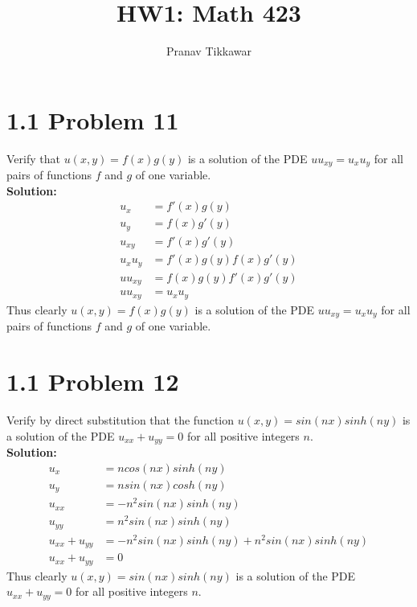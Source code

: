 \documentclass{article}
\author{Pranav Tikkawar}
\title{HW1: Math 423}
\begin{document}
\maketitle

\section*{1.1 Problem 11}
Verify that $u(x,y) = f(x)g(y)$ is a solution of the PDE $u u_{xy} = u_x u_y$ for all pairs of functions $f$ and $g$ of one variable.\\
\textbf{Solution:}\\
\begin{align*}
    u_{x} &= f'(x)g(y)\\
    u_{y} &= f(x)g'(y)\\
    u_{xy} &= f'(x)g'(y)\\
    u_{x}u_{y} &= f'(x)g(y)f(x)g'(y)\\
    u u_{xy} &= f(x)g(y)f'(x)g'(y)\\
    u u_{xy} &= u_{x}u_{y}
\end{align*}
Thus clearly $u(x,y) = f(x)g(y)$ is a solution of the PDE $u u_{xy} = u_x u_y$ for all pairs of functions $f$ and $g$ of one variable.

\section*{1.1 Problem 12}
Verify by direct substitution that the function $u(x,y) = sin(nx)sinh(ny)$ is a solution of the PDE $u_{xx} + u_{yy} = 0$ for all positive integers $n$.\\
\textbf{Solution:}\\
\begin{align*}
    u_{x} &= ncos(nx)sinh(ny)\\
    u_{y} &= nsin(nx)cosh(ny)\\
    u_{xx} &= -n^2sin(nx)sinh(ny)\\
    u_{yy} &= n^2sin(nx)sinh(ny)\\
    u_{xx} + u_{yy} &= -n^2sin(nx)sinh(ny) + n^2sin(nx)sinh(ny)\\
    u_{xx} + u_{yy} &= 0
\end{align*}
Thus clearly $u(x,y) = sin(nx)sinh(ny)$ is a solution of the PDE $u_{xx} + u_{yy} = 0$ for all positive integers $n$.
\end{document}
